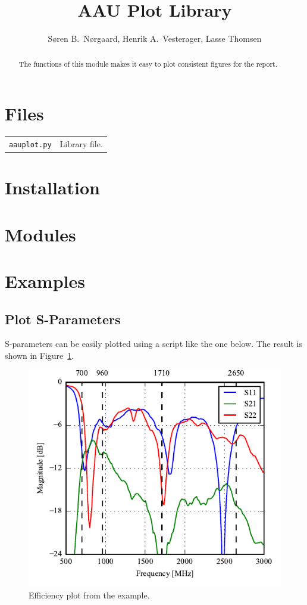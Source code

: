 \documentclass[10pt]{article}
\title{AAU Plot Library}
\author{Søren B.\ Nørgaard, Henrik A.\ Vesterager, Lasse Thomsen}
\begin{document}
\maketitle

\begin{abstract}
    The functions of this module makes it easy to plot consistent figures for the report.
\end{abstract}

\tableofcontents


\section{Files}
\begin{tabularx}{\linewidth}{lX}
    \texttt{aauplot.py} & Library file. \\
\end{tabularx}

\section{Installation}


\section{Modules}


\clearpage
\section{Examples}

\subsection{Plot S-Parameters}

S-parameters can be easily plotted using a script like the one below. The result is shown in Figure~\ref{fig:example1}.

\begin{figure}[htbp]
    \centering
    \includegraphics{examples/ex1_sparams.pdf}
    \caption{Efficiency plot from the example.}
    \label{fig:example1}
\end{figure}
\end{document}
